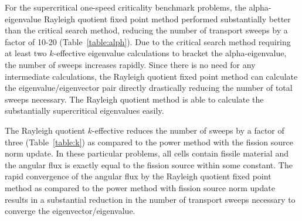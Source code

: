 For the supercritical one-speed criticality benchmark problems, the alpha-eigenvalue Rayleigh quotient fixed point method performed substantially better than the critical search method, reducing the number of transport sweeps by a factor of 10-20 (Table~\ref{table:alph}). Due to the critical search method requiring at least two $k$-effective eigenvalue calculations to bracket the alpha-eigenvalue, the number of sweeps increases rapidly. Since there is no need for any intermediate calculations, the Rayleigh quotient fixed point method can calculate the eigenvalue/eigenvector pair directly drastically reducing the number of total sweeps necessary. The Rayleigh quotient method is able to calculate the substantially supercritical eigenvalues easily.

The Rayleigh quotient $k$-effective reduces the number of sweeps by a factor of three (Table~\ref{table:k}) as compared to the power method with the fission source norm update. In these particular problems, all cells contain fissile material and the angular flux is exactly equal to the fission source within some constant. The rapid convergence of the angular flux by the Rayleigh quotient fixed point method as compared to the power method with fission source norm update results in a substantial reduction in the number of transport sweeps necessary to converge the eigenvector/eigenvalue.

\begin{table}[H]
    \centering
    \caption{Reference Eigenvalues for Infinite Medium Problems in \cite{sood2003analytical}}
\label{table:InfMed}
    \scalebox{1.00}{
    \begin{tabular}{*3c}
        \toprule
        & \multicolumn{2}{c}{Eigenvalues} \\
        \cmidrule(lr){2-3}
        Problem & Reference & Reference \\    
        ID   & $k_{\infty}$  & $\alpha_{\infty}$ (s$^{-1}$) \\
        \midrule
        PUa-1-0-IN &  2.612903 & 0.1632 \\
        PUb-1-0-IN & 2.290323 & 0.1306 \\
	Ua-1-0-IN &  2.25 & 0.1265 \\
	Ub-1-0-IN & 2.330917 & 0.1347 \\
	Uc-1-0-IN & 2.256083 & 0.1271 \\
	Ud-1-0-IN & 2.232667 & 0.1247 \\
        \bottomrule
    \end{tabular}
    }
\end{table}

